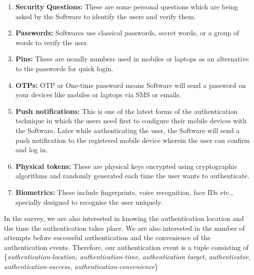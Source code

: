 \begin{enumerate}
    \item \textbf{Security Questions:} These are some personal questions which are being asked by the Software to identify the users and verify them.
    \item \textbf{Passwords:} Softwares use classical passwords, secret words, or a group of words to verify the user. 
    \item \textbf{Pins:} These are usually numbers used in mobiles or laptops as an alternative to the passwords for quick login. 
    \item \textbf{OTPs:} OTP or One-time password means Software will send a password on your devices like mobiles or laptops via SMS or emails.
    \item \textbf{Push notifications:} This is one of the latest forms of the authentication technique in which the users need first to configure their mobile devices with the Software. Later while authenticating the user, the Software will send a push notification to the registered mobile device wherein the user can confirm and log in. 
    \item \textbf{Physical tokens:} These are physical keys encrypted using cryptographic algorithms and randomly generated each time the user wants to authenticate.
    \item \textbf{Biometrics:} These include fingerprints, voice recognition, face IDs etc., specially designed to recognise the user uniquely.
\end{enumerate}

In the survey, we are also interested in knowing the authentication location and the time the authentication takes place. We are also interested in the number of attempts before successful authentication and the convenience of the authentication events. Therefore, our authentication event is a tuple consisting of \{\textit{authentication-location, authentication-time, authentication target, authenticator, authentication-success, authentication-convenience}\}
